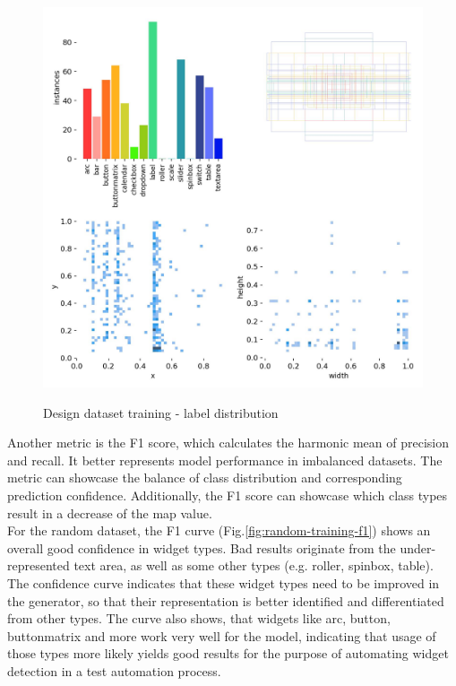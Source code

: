 \documentclass[Bachelor, BIC, english, fhCitStyle, IEEE]{BASE/twbook} %
\begin{document}
\begin{figure}[H]
    \caption{Design dataset training - label distribution}
    \centering
    \includegraphics[width=\textwidth]{PICs/train373/labels.jpg}
    \label{fig:design-training-labels}
\end{figure}
\noindent
Another metric is the F1 score, which calculates the harmonic mean of precision and recall. It better represents model performance in imbalanced datasets. The metric can showcase the balance of class distribution and corresponding prediction confidence. Additionally, the F1 score can showcase which class types result in a decrease of the \ac{map} value.\\
For the random dataset, the F1 curve (Fig.\ref{fig:random-training-f1}) shows an overall good confidence in widget types. Bad results originate from the under-represented text area, as well as some other types (e.g. roller, spinbox, table). The confidence curve indicates that these widget types need to be improved in the generator, so that their representation is better identified and differentiated from other types. The curve also shows, that widgets like arc, button, buttonmatrix and more work very well for the model, indicating that usage of those types more likely yields good results for the purpose of automating widget detection in a test automation process.
\end{document}
